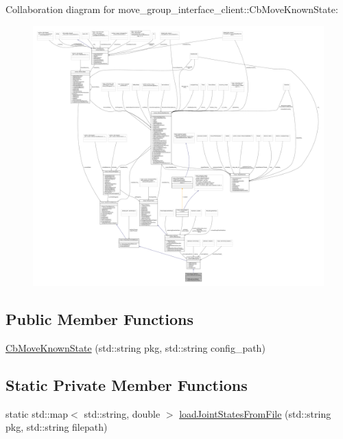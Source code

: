 Collaboration diagram for move\+\_\+group\+\_\+interface\+\_\+client\+:\+:Cb\+Move\+Known\+State\+:
\nopagebreak
\begin{figure}[H]
\begin{center}
\leavevmode
\includegraphics[width=350pt]{classmove__group__interface__client_1_1CbMoveKnownState__coll__graph}
\end{center}
\end{figure}
\subsection*{Public Member Functions}
\begin{DoxyCompactItemize}
\item 
\hyperlink{classmove__group__interface__client_1_1CbMoveKnownState_a40ec0e13fe77943e15ab83b5d7aca7ac}{Cb\+Move\+Known\+State} (std\+::string pkg, std\+::string config\+\_\+path)
\end{DoxyCompactItemize}
\subsection*{Static Private Member Functions}
\begin{DoxyCompactItemize}
\item 
static std\+::map$<$ std\+::string, double $>$ \hyperlink{classmove__group__interface__client_1_1CbMoveKnownState_af00c5ee81dfa5dd0817135279df09d74}{load\+Joint\+States\+From\+File} (std\+::string pkg, std\+::string filepath)
\end{DoxyCompactItemize}
